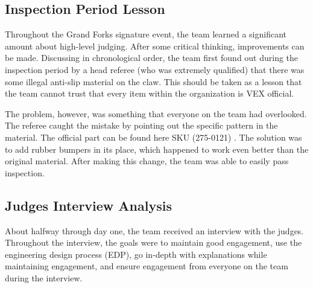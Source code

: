 \subsection*{Inspection Period Lesson}
Throughout the Grand Forks signature event, the team learned a significant amount about high-level judging. After some critical thinking, improvements can be made. Discussing in chronological order, the team first found out during the inspection period by a head referee (who was extremely qualified) that there was some illegal anti-slip material on the claw. This should be taken as a lesson that the team cannot trust that every item within the organization is VEX official. 

The problem, however, was something that everyone on the team had overlooked. The referee caught the mistake by pointing out the specific pattern in the material. The official part can be found here SKU (275-0121) \cite{vexRobotics}. The solution was to add rubber bumpers in its place, which happened to work even better than the original material. After making this change, the team was able to easily pass inspection.

\subsection*{Judges Interview Analysis}
About halfway through day one, the team received an interview with the judges. Throughout the interview, the goals were to maintain good engagement, use the engineering design process (EDP), go in-depth with explanations while maintaining engagement, and ensure engagement from everyone on the team during the interview.

